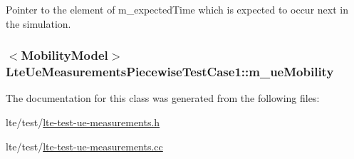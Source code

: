 Pointer to the element of {\ttfamily m\+\_\+expected\+Time} which is expected to occur next in the simulation. 

\subsubsection[{\texorpdfstring{m\+\_\+ue\+Mobility}{m_ueMobility}}]{$<${\bf Mobility\+Model}$>$ Lte\+Ue\+Measurements\+Piecewise\+Test\+Case1\+::m\+\_\+ue\+Mobility\hspace{0.3cm}{\ttfamily [private]}}\hypertarget{classLteUeMeasurementsPiecewiseTestCase1_aa80f896fa30885c5f47acc4d3332228b}{}\label{classLteUeMeasurementsPiecewiseTestCase1_aa80f896fa30885c5f47acc4d3332228b}


The documentation for this class was generated from the following files\+:\begin{DoxyCompactItemize}
\item 
lte/test/\hyperlink{lte-test-ue-measurements_8h}{lte-\/test-\/ue-\/measurements.\+h}\item 
lte/test/\hyperlink{lte-test-ue-measurements_8cc}{lte-\/test-\/ue-\/measurements.\+cc}\end{DoxyCompactItemize}
